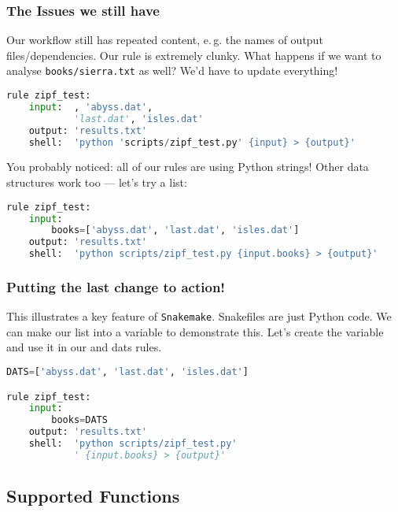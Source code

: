 \begin{frame}[fragile]
  \frametitle{The Issues we still have}
  Our workflow still has repeated content, e.\,g. the names of output files/dependencies. Our  rule is extremely clunky. What happens if we want to analyse \texttt{books/sierra.txt} as well? We’d have to update everything!
  \begin{lstlisting}[language=Python,style=Python, basicstyle=\tiny]
rule zipf_test:
    input:  , 'abyss.dat',
            'last.dat', 'isles.dat'
    output: 'results.txt'
    shell:  'python 'scripts/zipf_test.py' {input} > {output}'
  \end{lstlisting}
  You probably noticed: all of our rules are using Python strings! Other data structures work too — let’s try a list:
  \begin{lstlisting}[language=Python,style=Python, basicstyle=\tiny]
rule zipf_test:
    input:
        books=['abyss.dat', 'last.dat', 'isles.dat']
    output: 'results.txt'
    shell:  'python scripts/zipf_test.py {input.books} > {output}'
  \end{lstlisting}
\end{frame}

\begin{frame}[fragile]
  \frametitle{Putting the last change to action!}
  This illustrates a key feature of \texttt{Snakemake}. Snakefiles are just Python code. We can make our list into a variable to demonstrate this. Let’s create the variable  and use it in our  and dats rules.

  \begin{lstlisting}[language=Python,style=Python]
DATS=['abyss.dat', 'last.dat', 'isles.dat']

rule zipf_test:
    input:
        books=DATS
    output: 'results.txt'
    shell:  'python scripts/zipf_test.py'
            ' {input.books} > {output}'
  \end{lstlisting}
\end{frame}

\subsection{Supported Functions}

